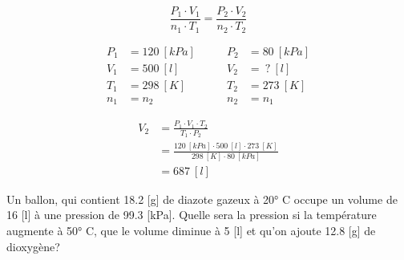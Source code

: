 \documentclass[
  11pt,
  a4paper,
  openany]{book}
\begin{document}
\begin{Answer}
\[
\frac{P_1 \cdot V_1}{n_1 \cdot T_1} = \frac{P_2 \cdot V_2}{n_2 \cdot T_2}
\]

\[
\begin{split}
    P_1 &= 120\ [kPa]\\
    V_1 &= 500\ [l]\\
    T_1 &= 298\ [K]\\
    n_1 &= n_2
\end{split}
\qquad
\begin{split}
    P_2 &= 80\ [kPa]\\
    V_2 &=\ ?\ [l]\\
    T_2 &= 273\ [K]\\
    n_2 &= n_1
\end{split}
\]

\[
\begin{split}
    V_2 &= \frac{P_1 \cdot V_1 \cdot T_2}{T_1 \cdot P_2} \\
    &= \frac{120\ [kPa] \cdot 500\ [l] \cdot 273\ [K]}{298\ [K] \cdot 80\ [kPa]} \\
    &= 687\ [l]
\end{split}
\]

\end{Answer}

\begin{Exercise}

Un ballon, qui contient 18.2 {[}g{]} de diazote gazeux à 20° C occupe un volume de 16 {[}l{]} à une pression de 99.3 {[}kPa{]}. Quelle sera la pression si la température augmente à 50° C, que le volume diminue à 5 {[}l{]} et qu'on ajoute 12.8 {[}g{]} de dioxygène?


\end{Exercise}
\end{document}

